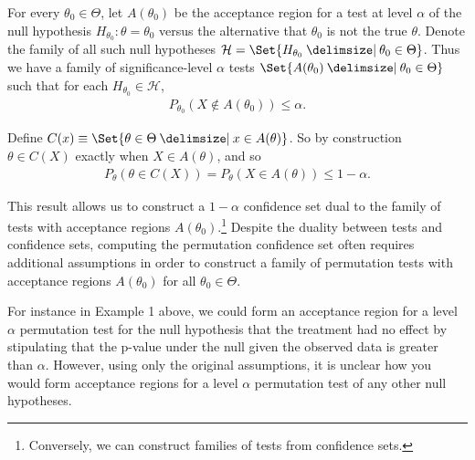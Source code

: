 For every $\theta_0 \in \Theta$, let $A(\theta_0)$ be the acceptance region for
a test at level $\alpha$ of the null hypothesis $H_{\theta_0}: \theta =
\theta_0$ versus the alternative that $\theta_0$ is not the true $\theta$.
Denote the family of all such null hypotheses $\mathcal{H} = \Set{H_{\theta_0}
\given \theta_0 \in \Theta}$.  Thus we have a family of significance-level
$\alpha$ tests $\Set{A(\theta_0) \given \theta_0 \in \Theta}$ such that for
each $H_{\theta_0} \in \mathcal{H}$,
\begin{align*}
P_{\theta_0}(X \notin A(\theta_0)) \le \alpha.
\end{align*}

Define $C(x) \equiv \Set{\theta \in \Theta \given x \in A(\theta)}$.
So by construction $\theta \in C(X)$ exactly when $X \in A(\theta)$, and so
\begin{align*}
P_{\theta}(\theta \in C(X)) = P_{\theta}(X \in A(\theta)) \le 1 - \alpha.
\end{align*}

This result allows us to construct a $1-\alpha$ confidence set dual to
the family of tests with acceptance regions $A(\theta_0)$.\footnote{Conversely,
we can construct families of tests from confidence sets.}  Despite the duality
between tests and confidence sets, computing the permutation confidence set
often requires additional assumptions in order to construct a family of
permutation tests with acceptance regions $A(\theta_0)$ for all $\theta_0 \in
\Theta$.

For instance in Example 1 above, we could form an acceptance region for a level
$\alpha$ permutation test for the null hypothesis that the treatment had no
effect by stipulating that the p-value under the null given the observed data
is greater than $\alpha$.  However, using only the original assumptions, it is
unclear how you would form acceptance regions for a level $\alpha$ permutation
test of any other null hypotheses. 

